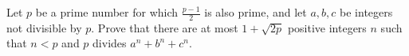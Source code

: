 Let $p$ be a prime number for which $\frac{p-1}{2}$ is also prime, and let $a,b,c$ be integers not divisible by $p$. Prove that there are at most $1+\sqrt {2p}$ positive integers $n$ such that $n<p$ and $p$ divides $a^n+b^n+c^n$.